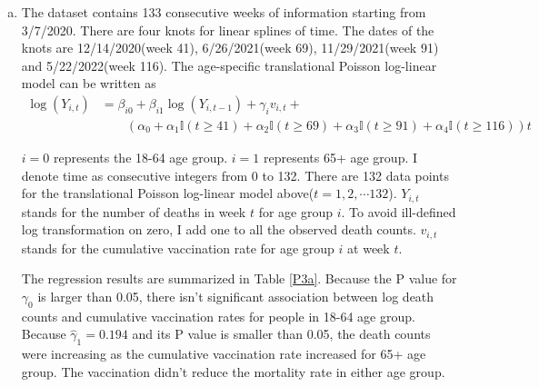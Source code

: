 \documentclass[12pt]{article}
\begin{document}
\begin{enumerate}[(a)]

\item The dataset contains 133 consecutive weeks of information starting from 3/7/2020. There are four knots for linear splines of time. The dates of the knots are 12/14/2020(week 41), 6/26/2021(week 69), 11/29/2021(week 91) and 5/22/2022(week 116). The age-specific translational Poisson log-linear model can be written as
\begin{align}
	\log(Y_{i, t}) &= \beta_{i0}+\beta_{i1}\log(Y_{i, t-1})+ \gamma_i v_{i, t} + \label{formulap3a} \\
	&\qquad \left(\alpha_{0} + \alpha_{1}\mathbb{I}(t \geq 41) + \alpha_{2}\mathbb{I}(t \geq 69) +\alpha_{3} \mathbb{I}(t \geq 91) + \alpha_{4}\mathbb{I}(t \geq 116)\right)t	\nonumber
\end{align}

 $i=0$ represents the 18-64 age group. $i=1$ represents 65+ age group. I denote time as consecutive integers from 0 to 132. There are 132 data points for the translational Poisson log-linear model above($t=1,2,\cdots 132$). $Y_{i,t}$ stands for the number of deaths in week $t$ for age group $i$. To avoid ill-defined log transformation on zero, I add one to all the observed death counts. $v_{i,t}$ stands for the cumulative vaccination rate for age group $i$ at week $t$.
 
The regression results are summarized in Table \ref{P3a}. Because the P value for $\gamma_0$ is larger than 0.05, there isn't significant association between log death counts and cumulative vaccination rates for people in 18-64 age group. Because $\hat{\gamma}_1 =0.194$ and its P value is smaller than 0.05, the death counts were increasing as the cumulative vaccination rate increased for 65+ age group. The vaccination didn't reduce the mortality rate in either age group.


\end{enumerate}
\end{document}
